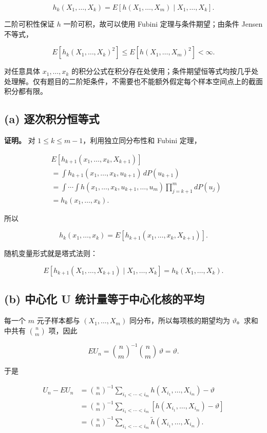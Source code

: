\[
h_k(X_1,\ldots,X_k)
=E[h(X_1,\ldots,X_m)\mid X_1,\ldots,X_k].
\tag{9.1}
\]

二阶可积性保证 $h$ 一阶可积，故可以使用 Fubini 定理与条件期望；由条件 Jensen 不等式，

\[
E[h_k(X_1,\ldots,X_k)^2]\le E[h(X_1,\ldots,X_m)^2]<\infty.
\]

对任意具体 $x_1,\ldots,x_k$ 的积分公式在积分存在处使用；条件期望恒等式均按几乎处处理解。仅有题目的二阶矩条件，不需要也不能额外假定每个样本空间点上的截面积分都有限。

\subsection{(a) 逐次积分恒等式}

\textbf{证明。} 对 $1\le k\le m-1$，利用独立同分布性和 Fubini 定理，

\[
\begin{aligned}
&E[h_{k+1}(x_1,\ldots,x_k,X_{k+1})]\\
&=\int h_{k+1}(x_1,\ldots,x_k,u_{k+1})\,dP(u_{k+1})\\
&=\int\cdots\int
h(x_1,\ldots,x_k,u_{k+1},\ldots,u_m)
\prod_{j=k+1}^m dP(u_j)\\
&=h_k(x_1,\ldots,x_k).
\end{aligned}
\]

所以

\[
\boxed{h_k(x_1,\ldots,x_k)
=E[h_{k+1}(x_1,\ldots,x_k,X_{k+1})].}
\]

随机变量形式就是塔式法则：

\[
E[h_{k+1}(X_1,\ldots,X_{k+1})\mid X_1,\ldots,X_k]
=h_k(X_1,\ldots,X_k).
\]

\subsection{(b) 中心化 U 统计量等于中心化核的平均}

每一个 $m$ 元子样本都与 $(X_1,\ldots,X_m)$ 同分布，所以每项核的期望均为 $\vartheta$。求和中共有 $\binom nm$ 项，因此

\[
EU_n=\binom nm^{-1}\binom nm\,\vartheta=\vartheta.
\]

于是

\[
\begin{aligned}
U_n-EU_n
&=\binom nm^{-1}\sum_{i_1<\cdots<i_m}h(X_{i_1},\ldots,X_{i_m})
-\vartheta\\
&=\binom nm^{-1}\sum_{i_1<\cdots<i_m}
[h(X_{i_1},\ldots,X_{i_m})-\vartheta]\\
&=\boxed{\binom nm^{-1}\sum_{i_1<\cdots<i_m}
\widetilde h(X_{i_1},\ldots,X_{i_m})}.
\end{aligned}
\]


